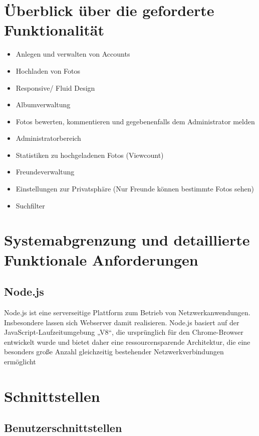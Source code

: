 \documentclass[a4paper,bibtotoc,oneside]{scrartcl}	%
\begin{document}
\section{Überblick über die geforderte Funktionalität}
	\begin{itemize}
		\item Anlegen und verwalten von Accounts
		\item Hochladen von Fotos
		\item Responsive/ Fluid Design
		\item Albumverwaltung
		\item Fotos bewerten, kommentieren und gegebenenfalls dem
		Administrator melden
		\item Administratorbereich
		\item Statistiken zu hochgeladenen Fotos (Viewcount)
		\item Freundeverwaltung
		\item Einstellungen zur Privatsphäre (Nur Freunde können
		bestimmte Fotos sehen)
		\item Suchfilter
	\end{itemize}
\section{Systemabgrenzung und detaillierte Funktionale Anforderungen}
	\subsection{Node.js}
	Node.js ist eine serverseitige Plattform zum Betrieb von
	Netzwerkanwendungen.  Insbesondere lassen sich Webserver damit 
	realisieren.  Node.js basiert auf der JavaScript-Laufzeitumgebung „V8“,
	die ursprünglich für den Chrome-Browser entwickelt wurde und bietet 
	daher eine ressourcensparende Architektur, die eine besonders große
	Anzahl gleichzeitig bestehender Netzwerkverbindungen ermöglicht

\section{Schnittstellen}
	\subsection{Benutzerschnittstellen}
\end{document}
